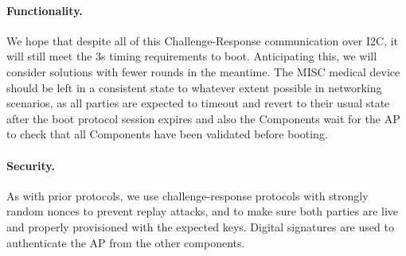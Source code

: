 \paragraph{Functionality.} We hope that despite all of this Challenge-Response communication over I2C, it will still meet the 3s timing requirements to boot. Anticipating this, we will consider solutions with fewer rounds in the meantime. The MISC medical device should be left in a consistent state to whatever extent possible in networking scenarios, as all parties are expected to timeout and revert to their usual state after the boot protocol session expires and also the Components wait for the AP to check that all Components have been validated before booting.

\paragraph{Security. } As with prior protocols, we use challenge-response protocols with strongly random nonces to prevent replay attacks, and to make sure both parties are live and properly provisioned with the expected keys. Digital signatures are used to authenticate the AP from the other components.